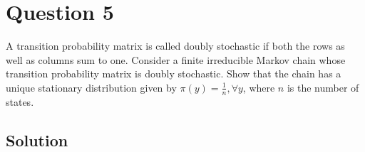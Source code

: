 \section*{Question 5}

A transition probability matrix is called doubly stochastic if both the rows as well as columns sum to one.
Consider a finite irreducible Markov chain whose transition probability matrix is doubly stochastic.
Show that the chain has a unique stationary distribution given by \( \pi(y)=\frac{1}{n}, \forall y \), where \( n \) is the number of states.

\subsection*{Solution}
